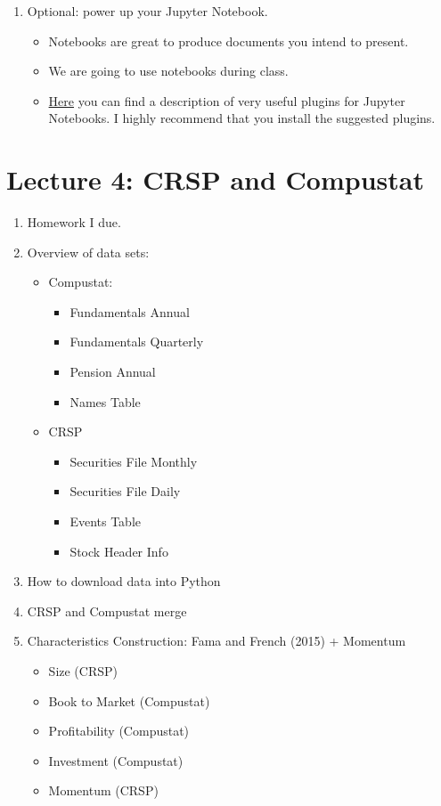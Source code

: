 \documentclass[12pts]{article}
\begin{document}
\begin{enumerate}
	\item Optional: power up your Jupyter Notebook.
	\begin{itemize}
		\item Notebooks are great to produce documents you intend to present.
		\item We are going to use notebooks during class.
		\item \href{https://towardsdatascience.com/bringing-the-best-out-of-jupyter-notebooks-for-data-science-f0871519ca29}{Here} you can find a description of very useful plugins for Jupyter Notebooks. I highly recommend that you install the suggested plugins.  
	\end{itemize}
	
	
\end{enumerate}

\section*{Lecture 4: CRSP and Compustat}

\begin{enumerate}
	\item Homework I due.
	\item Overview of data sets:	
	\begin{itemize}
		\item Compustat:
	\begin{itemize}
		\item Fundamentals Annual
		\item Fundamentals Quarterly
		\item Pension Annual
		\item Names Table 
	\end{itemize}
	\item CRSP
	\begin{itemize}
		\item Securities File Monthly 
		\item Securities File Daily 
		\item Events Table
		\item Stock Header Info
	\end{itemize}
	\end{itemize}
	\item How to download data into Python
	\item CRSP and Compustat merge
	\item Characteristics Construction: Fama and French (2015) + Momentum
	\begin{itemize}
		\item Size (CRSP)
		\item Book to Market (Compustat)
		\item Profitability (Compustat)
		\item Investment (Compustat)
		\item Momentum (CRSP)
	\end{itemize}
\end{enumerate}
\end{document}
